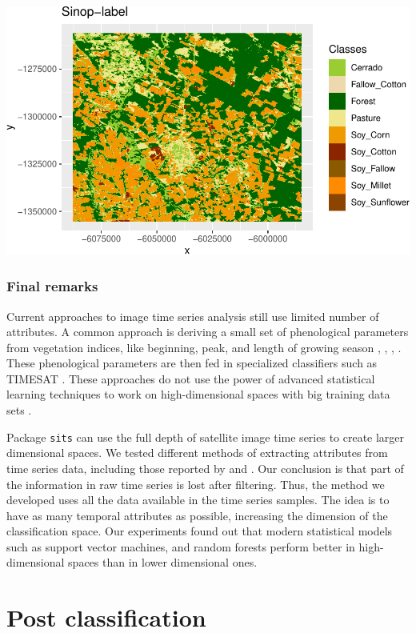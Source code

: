 \documentclass[a4paper,]{tufte-book}
\begin{document}
\begin{center}\includegraphics[width=0.7\linewidth]{sitsbook_files/figure-latex/unnamed-chunk-66-1} \end{center}

\hypertarget{final-remarks}{%
\section{Final remarks}\label{final-remarks}}

Current approaches to image time series analysis still use limited number of attributes. A common approach is deriving a small set of phenological parameters from vegetation indices, like beginning, peak, and length of growing season \citep{Brown2013}, \citep{Kastens2017}, \citep{Estel2015}, \citep{Pelletier2016}. These phenological parameters are then fed in specialized classifiers such as TIMESAT \citep{Jonsson2004}. These approaches do not use the power of advanced statistical learning techniques to work on high-dimensional spaces with big training data sets \citep{James2013}.

Package \texttt{sits} can use the full depth of satellite image time series to create larger dimensional spaces. We tested different methods of extracting attributes from time series data, including those reported by \citet{Pelletier2016} and \citet{Kastens2017}. Our conclusion is that part of the information in raw time series is lost after filtering. Thus, the method we developed uses all the data available in the time series samples. The idea is to have as many temporal attributes as possible, increasing the dimension of the classification space. Our experiments found out that modern statistical models such as support vector machines, and random forests perform better in high-dimensional spaces than in lower dimensional ones.

\hypertarget{part-post-classification}{%
\part{Post classification}\label{part-post-classification}}
\end{document}

